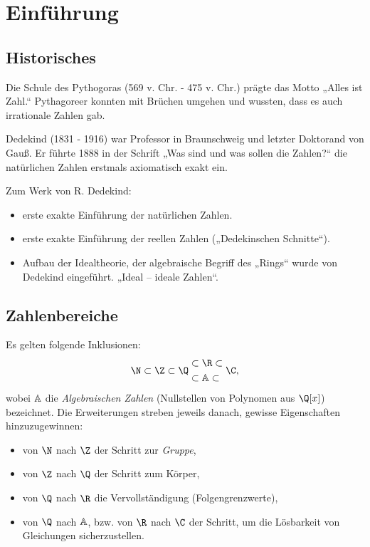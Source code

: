 \chapter{Einführung}




\section{Historisches}


Die Schule des Pythogoras (569 v. Chr. - 475 v. Chr.) prägte das Motto „Alles ist Zahl.“
Pythagoreer konnten mit Brüchen umgehen und wussten, dass es auch irrationale Zahlen gab.

Dedekind (1831 - 1916) war Professor in Braunschweig und letzter Doktorand von Gauß.
Er führte 1888 in der Schrift „Was sind und was sollen die Zahlen?“ die natürlichen Zahlen erstmals axiomatisch exakt ein.

Zum Werk von R. Dedekind:
\begin{itemize}
	\item
		erste exakte Einführung der natürlichen Zahlen.
	\item
		erste exakte Einführung der reellen Zahlen („Dedekinschen Schnitte“).
	\item
		Aufbau der Idealtheorie, der algebraische Begriff des „Rings“ wurde von Dedekind eingeführt.
		„Ideal – ideale Zahlen“.
\end{itemize}


\section{Zahlenbereiche}

Es gelten folgende Inklusionen:
\begin{align*}
	\N \subset \Z \subset \Q
	\begin{aligned}
		&\subset \R \subset \\
		&\subset \A \subset
	\end{aligned}\;
	\C,
\end{align*}
wobei $\mathbb{A}$ die \emph{Algebraischen Zahlen} (Nullstellen von Polynomen aus $\Q[x]$) bezeichnet.
Die Erweiterungen streben jeweils danach, gewisse Eigenschaften hinzuzugewinnen:
\begin{itemize}
	\item
		von $\N$ nach $\Z$ der Schritt zur \emph{Gruppe},
	\item
		von $\Z$ nach $\Q$ der Schritt zum Körper,
	\item
		von $\Q$ nach $\R$ die Vervollständigung (Folgengrenzwerte),
	\item
		von $\Q$ nach $\mathbb{A}$, bzw. von $\R$ nach $\C$ der Schritt, um die Lösbarkeit von Gleichungen sicherzustellen.
\end{itemize}

